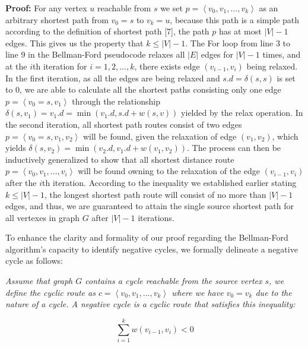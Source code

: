 \documentclass[12pt]{article}
\begin{document}
\textbf{Proof:}
For any vertex $u$ reachable from $s$ we set $p = \left\langle v_0, v_1,...,v_k\right\rangle$ as an arbitrary shortest path from $v_0 = s$ to $v_k = u$, because this path is a simple path according to the definition of shortest path [7], the path $p$ has at most $|V| - 1$ edges. This gives us the property that $k \le |V| - 1$. The For loop from line 3 to line 9 in the Bellman-Ford pseudocode relaxes all $|E|$ edges for $|V| - 1$ times, and at the $i$th iteration for $i = 1,2,...,k$, there exists edge $(v_{i-1}, v_i)$ being relaxed. In the first iteration, as all the edges are being relaxed and $s.d = \delta(s, s)$ is set to $0$, we are able to calculate all the shortest paths consisting only one edge $p = \left\langle v_0=s, v_1\right\rangle$ through the relationship $\delta(s, v_{1}) = v_{1}.d = \min(v_{1}.d, s.d + w(s, v))$ yielded by the relax operation. In the second iteration, all shortest path routes consist of two edges $p = \left\langle v_0=s, v_1, v_2\right\rangle$ will be found, given the relaxation of edge $(v_1, v_2)$, which yields $\delta(s, v_{2})  = \min(v_{2}.d, v_{1}.d + w(v_{1}, v_2))$. The process can then be inductively generalized to show that all shortest distance route $p = \left\langle v_0, v_1,...,v_i\right\rangle$ will be found owning to the relaxation of the edge $(v_{i-1}, v_i)$ after the $i$th iteration. According to the inequality we established earlier stating $k \le |V| - 1$, the longest shortest path route will consist of no more than $|V| - 1$ edges, and thus, we are guaranteed to attain the single source shortest path for all vertexes in graph $G$ after $|V| - 1$ iterations.

\hspace*{\fill} %

To enhance the clarity and formality of our proof regarding the Bellman-Ford algorithm's capacity to identify negative cycles, we  formally delineate a negative cycle as follows:

\hspace*{\fill} %

\textit{Assume that graph $G$ contains a cycle reachable from the source vertex $s$, we define the cyclic route as $c = \left\langle v_0, v_1,...,v_k\right\rangle$ where we have $v_0 = v_k$ due to the nature of a cycle. A negative cycle is a cyclic route that satisfies this inequality:} %

\begin{equation}
\sum_{i=1}^{k} w(v_{i-1}, v_i) < 0 \label{wef}
\end{equation}
\end{document}
